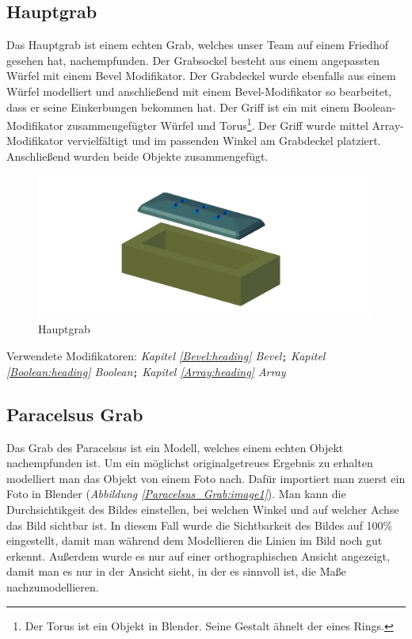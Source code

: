 \subsection{Hauptgrab}
\label{Hauptgrab:Heading}
Das Hauptgrab ist einem echten Grab, welches unser Team auf einem Friedhof gesehen hat, nachempfunden. Der Grabsockel besteht aus einem angepassten Würfel
mit einem Bevel Modifikator. Der Grabdeckel wurde ebenfalls aus einem Würfel modelliert und anschließend mit einem Bevel-Modifikator so bearbeitet, dass
er seine Einkerbungen bekommen hat. Der Griff ist ein mit einem Boolean-Modifikator zusammengefügter Würfel und Torus\footnote{Der Torus ist ein Objekt in Blender. Seine Gestalt ähnelt der eines Rings.}.
Der Griff wurde mittel Array-Modifikator vervielfältigt und im passenden Winkel am Grabdeckel platziert. Anschließend wurden beide Objekte zusammengefügt.

\raggedbottom
\begin{figure}[H]
    \centering
    \includegraphics[width=.8\textwidth]{images/Hauptgrab_Grab.png}
    \caption{Hauptgrab}
    \label{Hauptgrab:Image1}
\end{figure}

Verwendete Modifikatoren: \textit{Kapitel \ref{Bevel:heading} \dq Bevel\dq}\verb+;+ \textit{Kapitel \ref{Boolean:heading} \dq Boolean\dq}\verb+;+ \textit{Kapitel \ref{Array:heading} \dq Array\dq}

\subsection{Paracelsus Grab}
\label{paracelsusgrab:ref1}
Das Grab des Paracelsus ist ein Modell, welches einem echten Objekt nachempfunden ist. Um ein möglichst originalgetreues Ergebnis zu erhalten
modelliert man das Objekt von einem Foto nach. Dafür importiert man zuerst ein Foto in Blender (\textit{Abbildung \ref{Paracelsus_Grab:image1}}).
Man kann die Durchsichtikgeit des Bildes einstellen, bei welchen Winkel und auf welcher Achse das Bild sichtbar ist.
In diesem Fall wurde die Sichtbarkeit des Bildes auf 100\% eingestellt, damit man während dem Modellieren die Linien im Bild noch gut erkennt.
Außerdem wurde es nur auf einer orthographischen Ansicht angezeigt, damit man es nur in der Ansicht sieht, in der es sinnvoll ist, die Maße nachzumodellieren.

